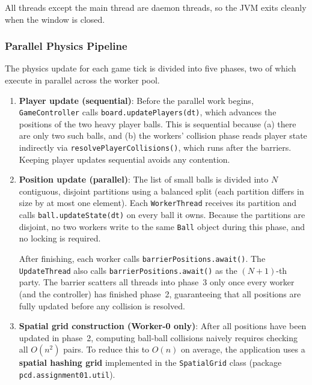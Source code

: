 \documentclass[12pt,a4paper]{article}
\begin{document}
All threads except the main thread are daemon threads, so the JVM exits cleanly
when the window is closed.
 
\subsubsection{Parallel Physics Pipeline}
 
The physics update for each game tick is divided into five phases, two of which
execute in parallel across the worker pool.
 
\begin{enumerate}
	\item \textbf{Player update (sequential)}: Before the parallel work begins, \texttt{GameController} calls \texttt{board.updatePlayers(dt)}, which advances the positions of the two heavy player balls. This is sequential because (a) there are only two such balls, and (b) the workers' collision phase reads player state indirectly via \texttt{resolvePlayerCollisions()}, which runs after the barriers. Keeping player updates sequential avoids any contention.
 
	\item \textbf{Position update (parallel)}: The list of small balls is divided into $N$ contiguous, disjoint partitions using a balanced split (each partition differs in size by at most one element). Each \texttt{WorkerThread} receives its partition and calls \texttt{ball.updateState(dt)} on every ball it owns. Because the partitions are disjoint, no two workers write to the same \texttt{Ball} object during this phase, and no locking is required.
 
After finishing, each worker calls \texttt{barrierPositions.await()}. The \texttt{UpdateThread} also calls \texttt{barrierPositions.await()} as the $(N+1)$-th party. The barrier scatters all threads into phase~3 only once every worker (and the controller) has finished phase~2, guaranteeing that all positions are fully updated before any collision is resolved.
 
	\item \textbf{Spatial grid construction (Worker-0 only)}: After all positions have been updated in phase~2, computing ball-ball collisions naively requires checking all $O(n^2)$ pairs. To reduce this to $O(n)$ on average, the application uses a \textbf{spatial hashing grid} implemented in the \texttt{SpatialGrid} class (package \texttt{pcd.assignment01.util}).
 

\end{enumerate}
\end{document}
